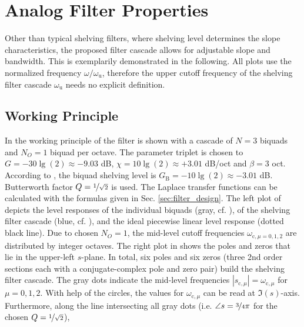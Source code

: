 \section{Analog Filter Properties}
\label{sec:analog_filter_properties}
%
Other than typical shelving filters,
where shelving level determines the slope characteristics,
the proposed filter cascade allows for adjustable slope and bandwidth.
%
This is exemplarily demonstrated in the following.
%
All plots use the normalized frequency $\omega/\omega_\mathrm{u}$,
therefore the upper cutoff frequency of the shelving filter cascade
$\omega_\mathrm{u}$ needs no explicit definition.
%
%
%
%
%
\subsection{Working Principle}
%
In  the working principle of the filter is shown
with a cascade of $N=3$ biquads and $N_O=1$ biquad per octave.
%
The parameter triplet is chosen to
$G = - 30 \lg(2) \approx - 9.03$ dB,
$\chi = 10 \lg(2) \approx +3.01$ dB/oct
and $\beta=3$ oct.
%
According to , the biquad shelving level is
$G_\mathrm{B} = -10 \lg(2) \approx -3.01$ dB.
%
Butterworth factor $Q=\nicefrac{1}{\sqrt{2}}$ \cite[p.792]{Ballou2008} is used.
%
The Laplace transfer functions can be calculated with the formulas given in
Sec. \ref{sec:filter_design}.
%
The left plot of  depicts the level responses of
the individual biquads (gray, cf. ),
of the shelving filter cascade (blue, cf. ),
and the ideal piecewise linear level response (dotted black line).
%
Due to chosen $N_O=1$, the mid-level cutoff frequencies $\omega_{\mathrm{c},\mu=0,1,2}$
are distributed by integer octaves.
%
The right plot in  shows the poles and zeros
that lie in the upper-left $s$-plane.
%
In total, six poles and six zeros (three 2nd order sections each with a
conjugate-complex pole and zero pair) build the shelving filter cascade.
%
The gray dots indicate the mid-level frequencies
$|s_{\mathrm{c},\mu}|=\omega_{\mathrm{c},\mu}$ for $\mu=0,1,2$.
%
With help of the circles,
the values for $\omega_{\mathrm{c},\mu}$ can be read at $\Im(s)$-axis.
%
Furthermore, along the line intersecting all gray dots
(i.e. $\angle s = \nicefrac{3}{4}\pi$ for the chosen $Q=\nicefrac{1}{\sqrt{2}}$),
